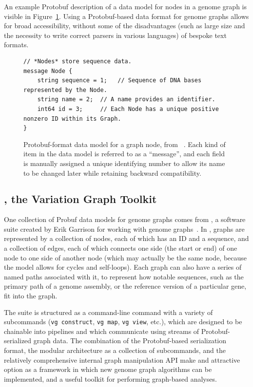 An example Protobuf description of a data model for nodes in a genome graph is visible in Figure~\ref{fig:protobuf}. Using a Protobuf-based data format for genome graphs allows for broad accessibility, without some of the disadvantages (such as large size and the necessity to write correct parsers in various languages) of bespoke text formats. 

\begin{figure}[ht]
\begin{lstlisting}
// *Nodes* store sequence data.
message Node {
    string sequence = 1;   // Sequence of DNA bases represented by the Node.
    string name = 2;  // A name provides an identifier.
    int64 id = 3;     // Each Node has a unique positive nonzero ID within its Graph.
}
\end{lstlisting}
\caption[Graph node data model]{Protobuf-format data model for a graph node, from \vg ~\cite{garrison2016vg}. Each kind of item in the data model is referred to as a ``message'', and each field is manually assigned a unique identifying number to allow its name to be changed later while retaining backward compatibility.}
\label{fig:protobuf}
\end{figure}

\subsection{\vg, the Variation Graph Toolkit}


One collection of Probuf data models for genome graphs comes from \vg, a software suite created by Erik Garrison for working with genome graphs~\cite{garrison2016vg}. In \vg, graphs are represented by a collection of nodes, each of which has an ID and a sequence, and a collection of edges, each of which connects one side (the start or end) of one node to one side of another node (which may actually be the same node, because the \vg model allows for cycles and self-loops). Each graph can also have a series of named paths associated with it, to represent how notable sequences, such as the primary path of a genome assembly, or the reference version of a particular gene, fit into the graph.

The \vg suite is structured as a command-line \vg command with a variety of subcommands (\texttt{vg construct}, \texttt{vg map}, \texttt{vg view}, etc.), which are designed to be chainable into pipelines and which communicate using streams of Protobuf-serialized graph data. The combination of the Protobuf-based serialization format, the modular architecture as a collection of subcommands, and the relatively comprehensive internal graph manipulation API make \vg and attractive option as a framework in which new genome graph algorithms can be implemented, and a useful toolkit for performing graph-based analyses.

